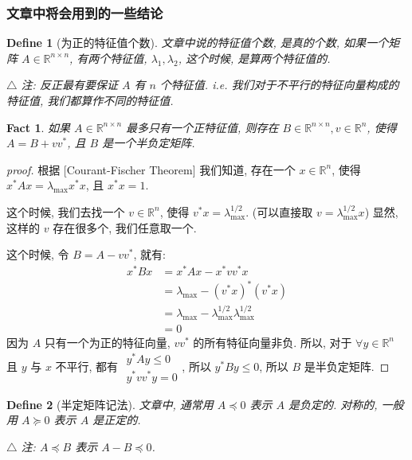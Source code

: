 \documentclass{article}
\newtheorem{define}{Define}
\newtheorem{fact}{Fact}
\begin{document}
\subsubsection{文章中将会用到的一些结论}
\begin{define}[为正的特征值个数]
  文章中说的特征值个数, 是真的个数, 如果一个矩阵 $A \in \mathbb{R}^{n\times n}$, 有两个特征值, $\lambda_1, \lambda_2$, 这个时候, 是算两个特征值的.

  $\triangle$ 注: 反正最有要保证 $A$ 有 $n$ 个特征值. i.e. 我们对于不平行的特征向量构成的特征值, 我们都算作不同的特征值.
\end{define}
\begin{fact}
  \label{proof_PSD}
  如果 $A \in \mathbb{R}^{n\times n}$ 最多只有一个正特征值,
  则存在 $B \in \mathbb{R}^{n\times n}, v \in \mathbb{R}^n$,
  使得 $A = B + vv^*$, 且 $B$ 是一个半负定矩阵.
\end{fact}
\begin{proof}[proof]
  根据 [Courant-Fischer Theorem] 我们知道, 存在一个 $x \in \mathbb{R}^n$, 使得 $x^*Ax = \lambda_{\max}x^*x$, 且 $x^*x = 1$.

  这个时候, 我们去找一个 $v\in\mathbb{R}^n$, 使得 $v^*x = \lambda_{\max}^{1/2}$.
  (可以直接取 $v = \lambda_{\max}^{1/2}x$)
  显然, 这样的 $v$ 存在很多个, 我们任意取一个.

  这个时候, 令 $B = A - vv^*$, 就有:
  \begin{align*}
    x^*Bx  &= x^*Ax - x^*vv^*x \\
    &= \lambda_{\max} - (v^*x)^*(v^*x) \\
    &= \lambda_{\max} - \lambda_{\max}^{1/2}\lambda_{\max}^{1/2} \\
    &= 0
  \end{align*}
  因为 $A$ 只有一个为正的特征向量, $vv^*$ 的所有特征向量非负.
  所以, 对于 $\forall y\in\mathbb{R}^n$ 且 $y$ 与 $x$ 不平行, 都有
  $\substack{y^*Ay\leq 0 \\ y^*vv^*y = 0}$, 所以 $y^*By \leq 0$, 所以 $B$ 是半负定矩阵.
\end{proof}

\begin{define}[半定矩阵记法]
  文章中, 通常用 $A\preccurlyeq 0$ 表示 $A$ 是负定的.
  对称的, 一般用 $A\succcurlyeq 0$ 表示 $A$ 是正定的.

  $\triangle$ 注: $A\preccurlyeq B$ 表示 $A - B \preccurlyeq 0$.
\end{define}
\end{document}
